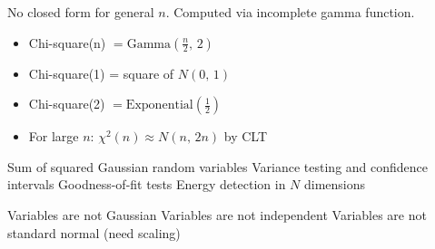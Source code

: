 


No closed form for general $n$. Computed via incomplete gamma function.






\begin{itemize}
\tightlist
\item
  Chi-square(n) $= \mathrm{Gamma}\left(\frac{n}{2},\, 2\right)$
\item
  Chi-square(1) = square of $N(0,\,1)$
\item
  Chi-square(2) $= \mathrm{Exponential}\left(\frac{1}{2}\right)$
\item
  For large $n$: $\chi^{2}(n) \approx N(n,\, 2n)$ by CLT
\end{itemize}


\PSyes{} Sum of squared Gaussian random variables\PSbr{}\PSyes{} Variance testing and confidence intervals\PSbr{}\PSyes{} Goodness-of-fit tests\PSbr{}\PSyes{} Energy detection in $N$ dimensions


\PSno{} Variables are not Gaussian\PSbr{}\PSno{} Variables are not independent\PSbr{}\PSno{} Variables are not standard normal (need scaling)







